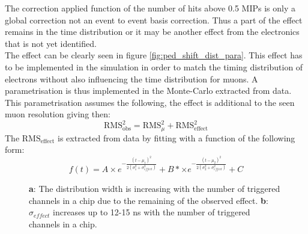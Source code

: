 The correction applied function of the number of hits above 0.5 MIPs is only a global correction not an event to event basis correction. Thus a part of the effect remains in the time distribution or it may be another effect from the electronics that is not yet identified.\\
The effect can be clearly seen in figure \ref{fig:ped_shift_dist_para}. This effect has to be implemented in the simulation in order to match the timing distribution of electrons without also influencing the time distribution for muons. A parametrisation is thus implemented in the Monte-Carlo extracted from data. This parametrisation assumes the following, the effect is additional to the seen muon resolution giving then:
\begin{equation*}
\text{RMS}_{\text{obs}}^2 = \text{RMS}_{\mu}^2 + \text{RMS}_{\text{effect}}^2
\end{equation*}
The $\text{RMS}_{\text{effect}}$ is extracted from data by fitting with a function of the following form:
\begin{equation*}
f(t) = A \times e^{-\frac{(t-\mu_1)^2}{2(\sigma_1^2 + \sigma_{effect}^2)}} + B* \times e^{-\frac{(t-\mu_2)^2}{2(\sigma_2^2 + \sigma_{effect}^2)}} + C
\end{equation*}

\begin{figure}[htbp]
	\hfill
	\caption[]{\textbf{a}: The distribution width is increasing with the number of triggered channels in a chip due to the remaining of the observed effect. \textbf{b}: $\sigma_{effect}$ increases up to 12-15 ns with the number of triggered channels in a chip.}
	\label{fig:mc_para}
\end{figure}

